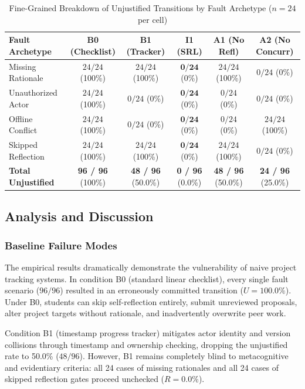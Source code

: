 \documentclass[11pt,a4paper]{article}
\begin{document}
\begin{table}[htbp]
\centering
\small
\caption{Fine-Grained Breakdown of Unjustified Transitions by Fault Archetype ($n=24$ per cell)}
\label{tab:fault-breakdown}
\begin{tabular}{lccccc}
\toprule
\textbf{Fault Archetype} & \textbf{B0 (Checklist)} & \textbf{B1 (Tracker)} & \textbf{I1 (SRL)} & \textbf{A1 (No Refl)} & \textbf{A2 (No Concurr)} \\
\midrule
Missing Rationale & $24 / 24$ (100\%) & $24 / 24$ (100\%) & $\mathbf{0 / 24}$ (0\%) & $24 / 24$ (100\%) & $0 / 24$ (0\%) \\
Unauthorized Actor & $24 / 24$ (100\%) & $0 / 24$ (0\%) & $\mathbf{0 / 24}$ (0\%) & $0 / 24$ (0\%) & $0 / 24$ (0\%) \\
Offline Conflict & $24 / 24$ (100\%) & $0 / 24$ (0\%) & $\mathbf{0 / 24}$ (0\%) & $0 / 24$ (0\%) & $24 / 24$ (100\%) \\
Skipped Reflection & $24 / 24$ (100\%) & $24 / 24$ (100\%) & $\mathbf{0 / 24}$ (0\%) & $24 / 24$ (100\%) & $0 / 24$ (0\%) \\
\midrule
\textbf{Total Unjustified} & \textbf{96 / 96} (100\%) & \textbf{48 / 96} (50.0\%) & \textbf{0 / 96} (0.0\%) & \textbf{48 / 96} (50.0\%) & \textbf{24 / 96} (25.0\%) \\
\bottomrule
\end{tabular}
\end{table}

\subsection{Analysis and Discussion}

\subsubsection{Baseline Failure Modes}
The empirical results dramatically demonstrate the vulnerability of naive project tracking systems. In condition B0 (standard linear checklist), every single fault scenario ($96/96$) resulted in an erroneously committed transition ($U = 100.0\%$). Under B0, students can skip self-reflection entirely, submit unreviewed proposals, alter project targets without rationale, and inadvertently overwrite peer work.

Condition B1 (timestamp progress tracker) mitigates actor identity and version collisions through timestamp and ownership checking, dropping the unjustified rate to 50.0\% ($48/96$). However, B1 remains completely blind to metacognitive and evidentiary criteria: all 24 cases of missing rationales and all 24 cases of skipped reflection gates proceed unchecked ($R = 0.0\%$).
\end{document}
